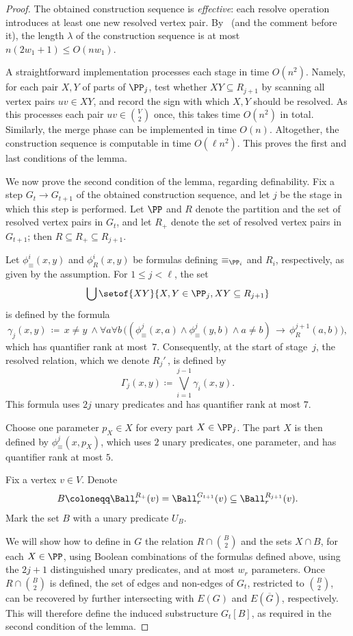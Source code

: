 \begin{proof}
The obtained construction sequence is \emph{effective}: each resolve operation introduces at least one new resolved vertex pair. By~\cite[Lemma~3.4]{mw-arxiv} (and the comment before it), the length $\lambda$ of the construction sequence is at most $n(2w_1+1) \leq O(nw_1)$.

A straightforward implementation processes each stage in time $O(n^2)$.
Namely, for each pair $X,Y$ of parts of $\PP_j$,
test whether $XY\subseteq R_{j+1}$ by scanning
all vertex pairs $uv\in XY$, and record the sign with which $X,Y$ should be resolved. As this processes each pair $uv\in {V\choose 2}$ once, this takes time $O(n^2)$ in total. Similarly, the merge phase can be implemented in time $O(n)$.
Altogether, the  construction sequence is computable in time $O(\ell n^2)$.
This proves the first and last conditions of the lemma.

\medskip

We now prove the second condition of the lemma, regarding definability.
Fix a step $G_t\to G_{t+1}$ of the obtained construction sequence, and let $j$ be the stage
in which this step is performed.
Let $\PP$ and $R$ denote the partition and the set of resolved vertex pairs in $G_t$, and let $R_{+}$ denote the set of resolved vertex pairs in $G_{t+1}$; then $R\subseteq R_{+}\subseteq R_{j+1}$.

  Let $\phi_\equiv^i(x,y)$ and $\phi_R^i(x,y)$ be formulas defining
$\equiv_{\PP_i}$ and $R_i$, respectively, as given by the assumption.
For $1\le j<\ell$, the set $$\bigcup\setof{XY}{X,Y\in\PP_j, XY\subseteq R_{j+1}}$$ is defined
by the formula
\[
 \gamma_j(x,y) \,\coloneqq\, x\ne y\ \land\forall a\forall b\,\bigl(
       (\phi_\equiv^{j}(x,a)\land\phi_\equiv^{j}(y,b)\land a\ne b)\,\to\,\phi_R^{j+1}(a,b)\bigr),
\]
which has quantifier rank at
most~$7$.  Consequently, at the start of stage~$j$, the resolved
relation, which we denote $R_j'$\,,
is defined by
\[
 \Gamma_{j}(x,y)\coloneqq \bigvee_{i=1}^{j-1}\gamma_i(x,y).
\]
This formula uses $2j$ unary predicates and has quantifier rank at most $7$.

Choose
one parameter $p_X\in X$ for every part $X\in \PP_j$.
The part $X$ is then defined by $\phi_\equiv^{j}(x,p_X)$, which
uses $2$ unary predicates, one parameter, and has quantifier rank at most $5$.

\medskip
Fix a vertex $v\in V$.
Denote
\[
 B\coloneqq \Ball^{R_{+}}_r(v)=\Ball^{G_{t+1}}_r(v)\subseteq\Ball^{R_{j+1}}_r(v).
\]
Mark the set $B$ with a unary predicate $U_B$.

We will show how to define in $G$ the relation $R\cap {B\choose 2}$ and the sets $X\cap B$, for each $X\in \PP$,
using Boolean combinations of the formulas defined above,
using the $2j+1$ distinguished unary predicates, and at most $w_r$ parameters.
Once $R\cap {B\choose 2}$ is defined, the set of  edges and non-edges of $G_t$, restricted to $B\choose 2$, can be recovered by further intersecting with $E(G)$ and $E(\overline G)$, respectively. This will therefore define the induced substructure $G_t[B]$, as required in the second condition of the lemma.


\end{proof}
